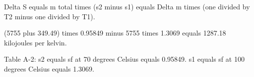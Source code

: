 Delta S equals m total times (s2 minus s1) equals Delta m times (one divided by T2 minus one divided by T1).  

(5755 plus 349.49) times 0.95849 minus 5755 times 1.3069 equals 1287.18 kilojoules per kelvin.  

Table A-2:  
s2 equals sf at 70 degrees Celsius equals 0.95849.  
s1 equals sf at 100 degrees Celsius equals 1.3069.